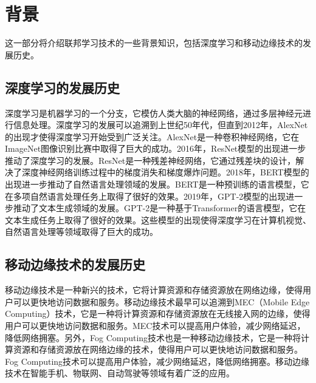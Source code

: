 \section{背景}

这一部分将介绍联邦学习技术的一些背景知识，包括深度学习和移动边缘技术的发展历史。

\subsection{深度学习的发展历史}

深度学习是机器学习的一个分支，它模仿人类大脑的神经网络，通过多层神经元进行信息处理。深度学习的发展可以追溯到上世纪50年代，但直到2012年，AlexNet的出现才使得深度学习开始受到广泛关注。AlexNet\cite{deng2009imagenet}是一种卷积神经网络，它在ImageNet\cite{deng2009imagenet}图像识别比赛中取得了巨大的成功。2016年，ResNet模型的出现进一步推动了深度学习的发展。ResNet是一种残差神经网络，它通过残差块的设计，解决了深度神经网络训练过程中的梯度消失和梯度爆炸问题。2018年，BERT模型的出现进一步推动了自然语言处理领域的发展。BERT是一种预训练的语言模型，它在多项自然语言处理任务上取得了很好的效果。2019年，GPT-2模型的出现进一步推动了文本生成领域的发展。GPT-2\cite{radford2019language}是一种基于Transformer的语言模型，它在文本生成任务上取得了很好的效果。这些模型的出现使得深度学习在计算机视觉、自然语言处理等领域取得了巨大的成功。

\subsection{移动边缘技术的发展历史}

移动边缘技术是一种新兴的技术，它将计算资源和存储资源放在网络边缘，使得用户可以更快地访问数据和服务。移动边缘技术最早可以追溯到MEC（Mobile Edge Computing）\cite{shi2016edge}技术，它是一种将计算资源和存储资源放在无线接入网的边缘，使得用户可以更快地访问数据和服务。MEC技术可以提高用户体验，减少网络延迟，降低网络拥塞。另外，Fog Computing\cite{bonomi2012fog}技术也是一种移动边缘技术，它是一种将计算资源和存储资源放在网络边缘的技术，使得用户可以更快地访问数据和服务。Fog Computing技术可以提高用户体验，减少网络延迟，降低网络拥塞。移动边缘技术在智能手机、物联网、自动驾驶等领域有着广泛的应用。